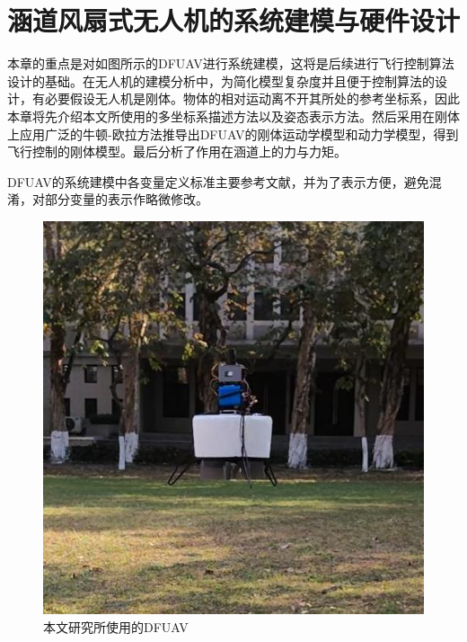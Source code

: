 \chapter{涵道风扇式无人机的系统建模与硬件设计}

本章的重点是对如图所示的DFUAV进行系统建模，这将是后续进行飞行控制算法设计的基础。在无人机的建模分析中，为简化模型复杂度并且便于控制算法的设计，有必要假设无人机是刚体。物体的相对运动离不开其所处的参考坐标系，因此本章将先介绍本文所使用的多坐标系描述方法以及姿态表示方法。然后采用在刚体上应用广泛的牛顿-欧拉方法推导出DFUAV的刚体运动学模型和动力学模型，得到飞行控制的刚体模型。最后分析了作用在涵道上的力与力矩。%

DFUAV的系统建模中各变量定义标准主要参考文献\parencite{杨一栋2019直升机飞行控制}，并为了表示方便，避免混淆，对部分变量的表示作略微修改。
\begin{figure}[htbp]
	\centering
	\begin{minipage}[c]{1\textwidth} %
		\centering
		\includegraphics[scale=1]{Fig/DFUAV.jpg}
		\caption{\label{DFUAV}本文研究所使用的DFUAV}
	\end{minipage}%
\end{figure}

